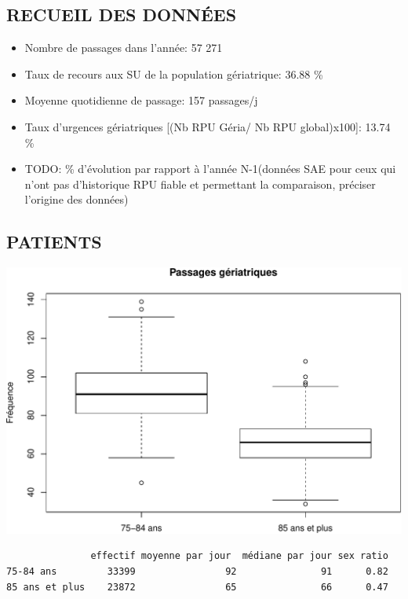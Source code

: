 \documentclass[]{article}
\begin{document}
\subsection{RECUEIL DES DONNÉES}\label{recueil-des-donnees-2}

\begin{itemize}
\itemsep1pt\parskip0pt
\item
  Nombre de passages dans l'année: 57 271
\item
  Taux de recours aux SU de la population gériatrique: 36.88 \%
\item
  Moyenne quotidienne de passage: 157 passages/j
\item
  Taux d'urgences gériatriques {[}(Nb RPU Géria/ Nb RPU global)x100{]}:
  13.74 \%
\item
  TODO: \% d'évolution par rapport à l'année N-1(données SAE pour ceux
  qui n'ont pas d'historique RPU fiable et permettant la comparaison,
  préciser l'origine des données)
\end{itemize}

\subsection{PATIENTS}\label{patients-2}

\includegraphics{rapport2014_V4_files/figure-latex/sexe75-1.pdf}

\begin{verbatim}
               effectif moyenne par jour  médiane par jour sex ratio
75-84 ans         33399                92               91      0.82
85 ans et plus    23872                65               66      0.47
\end{verbatim}
\end{document}
